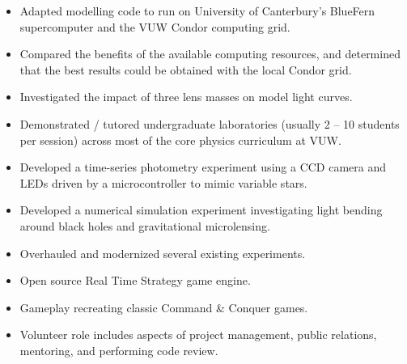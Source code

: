 \documentclass[print]{cv-style}
\begin{document}
\begin{entrylist}
  {
\begin{itemize}
	\item Adapted modelling code to run on University of Canterbury’s BlueFern supercomputer and the VUW Condor computing grid.
	\item Compared the benefits of the available computing resources, and determined that the best results could be obtained with the local Condor grid.
	\item Investigated the impact of three lens masses on model light curves.
  \end{itemize}}
  {
  \begin{itemize}
    \item Demonstrated / tutored undergraduate laboratories (usually 2 -- 10 students per session) across most of the core physics curriculum at VUW.
	\item Developed a time-series photometry experiment using a CCD camera and LEDs driven by a microcontroller to mimic variable stars.
	\item Developed a numerical simulation experiment investigating light bending around black holes and gravitational microlensing.
	\item Overhauled and modernized several existing experiments.
    \end{itemize}}
  {
\begin{itemize}
    \item Open source Real Time Strategy game engine.
    \item Gameplay recreating classic Command \& Conquer games.
	\item Volunteer role includes aspects of project management, public relations, mentoring, and performing code review.
  \end{itemize}}

\end{entrylist}
\end{document}
